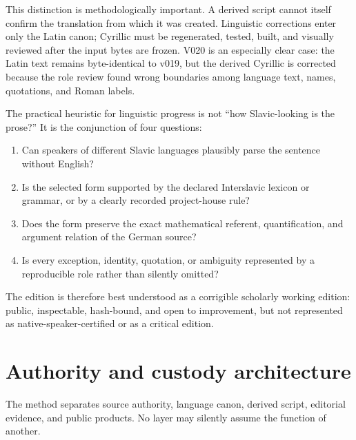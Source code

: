 \documentclass[11pt]{article}
\begin{document}
This distinction is methodologically important. A derived script cannot itself confirm the translation from which it was created. Linguistic corrections enter only the Latin canon; Cyrillic must be regenerated, tested, built, and visually reviewed after the input bytes are frozen. V020 is an especially clear case: the Latin text remains byte-identical to v019, but the derived Cyrillic is corrected because the role review found wrong boundaries among language text, names, quotations, and Roman labels.

The practical heuristic for linguistic progress is not ``how Slavic-looking is the prose?'' It is the conjunction of four questions:

\begin{enumerate}
\item Can speakers of different Slavic languages plausibly parse the sentence without English?
\item Is the selected form supported by the declared Interslavic lexicon or grammar, or by a clearly recorded project-house rule?
\item Does the form preserve the exact mathematical referent, quantification, and argument relation of the German source?
\item Is every exception, identity, quotation, or ambiguity represented by a reproducible role rather than silently omitted?
\end{enumerate}

The edition is therefore best understood as a corrigible scholarly working edition: public, inspectable, hash-bound, and open to improvement, but not represented as native-speaker-certified or as a critical edition.

\section{Authority and custody architecture}

The method separates source authority, language canon, derived script, editorial evidence, and public products. No layer may silently assume the function of another.
\end{document}
